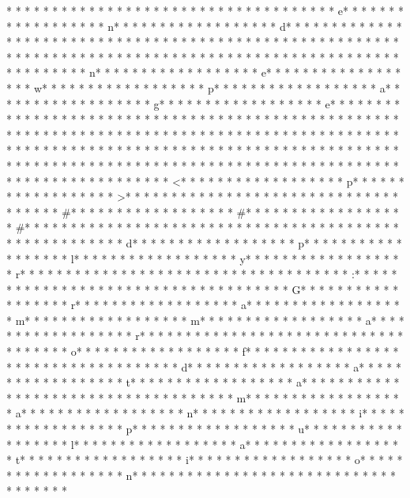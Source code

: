 * * *  * * *  * * *  *  * * *  *  * * *  * 	* * *  * * *  * * *  *  * * *  *  * * *  * e* * *  * * *  * * *  *  * * *  *  * * *  * n* * *  * * *  * * *  *  * * *  *  * * *  * d* * *  * * *  * * *  *  * * *  *  * * *  * {* * *  * * *  * * *  *  * * *  *  * * *  *  * * *  * * *  * * *  *  * * *  *  * * *  * }* * *  * * *  * * *  *  * * *  *  * * *  * 
* * *  * * *  * * *  *  * * *  *  * * *  * 	* * *  * * *  * * *  *  * * *  *  * * *  * n* * *  * * *  * * *  *  * * *  *  * * *  * e* * *  * * *  * * *  *  * * *  *  * * *  * w* * *  * * *  * * *  *  * * *  *  * * *  * p* * *  * * *  * * *  *  * * *  *  * * *  * a* * *  * * *  * * *  *  * * *  *  * * *  * g* * *  * * *  * * *  *  * * *  *  * * *  * e* * *  * * *  * * *  *  * * *  *  * * *  * 
* * *  * * *  * * *  *  * * *  *  * * *  * 	* * *  * * *  * * *  *  * * *  *  * * *  * 
* * *  * * *  * * *  *  * * *  *  * * *  * 	* * *  * * *  * * *  *  * * *  *  * * *  * 
* * *  * * *  * * *  *  * * *  *  * * *  * 	* * *  * * *  * * *  *  * * *  *  * * *  * 
* * *  * * *  * * *  *  * * *  *  * * *  * 	* * *  * * *  * * *  *  * * *  *  * * *  * 
* * *  * * *  * * *  *  * * *  *  * * *  * 	* * *  * * *  * * *  *  * * *  *  * * *  * <* * *  * * *  * * *  *  * * *  *  * * *  * p* * *  * * *  * * *  *  * * *  *  * * *  * >* * *  * * *  * * *  *  * * *  *  * * *  * 
* * *  * * *  * * *  *  * * *  *  * * *  * #* * *  * * *  * * *  *  * * *  *  * * *  * #* * *  * * *  * * *  *  * * *  *  * * *  * #* * *  * * *  * * *  *  * * *  *  * * *  *  * * *  * * *  * * *  *  * * *  *  * * *  * {* * *  * * *  * * *  *  * * *  *  * * *  * d* * *  * * *  * * *  *  * * *  *  * * *  * p* * *  * * *  * * *  *  * * *  *  * * *  * l* * *  * * *  * * *  *  * * *  *  * * *  * y* * *  * * *  * * *  *  * * *  *  * * *  * r* * *  * * *  * * *  *  * * *  *  * * *  *  * * *  * * *  * * *  *  * * *  *  * * *  * :* * *  * * *  * * *  *  * * *  *  * * *  *  * * *  * * *  * * *  *  * * *  *  * * *  * G* * *  * * *  * * *  *  * * *  *  * * *  * r* * *  * * *  * * *  *  * * *  *  * * *  * a* * *  * * *  * * *  *  * * *  *  * * *  * m* * *  * * *  * * *  *  * * *  *  * * *  * m* * *  * * *  * * *  *  * * *  *  * * *  * a* * *  * * *  * * *  *  * * *  *  * * *  * r* * *  * * *  * * *  *  * * *  *  * * *  *  * * *  * * *  * * *  *  * * *  *  * * *  * o* * *  * * *  * * *  *  * * *  *  * * *  * f* * *  * * *  * * *  *  * * *  *  * * *  *  * * *  * * *  * * *  *  * * *  *  * * *  * d* * *  * * *  * * *  *  * * *  *  * * *  * a* * *  * * *  * * *  *  * * *  *  * * *  * t* * *  * * *  * * *  *  * * *  *  * * *  * a* * *  * * *  * * *  *  * * *  *  * * *  *  * * *  * * *  * * *  *  * * *  *  * * *  * m* * *  * * *  * * *  *  * * *  *  * * *  * a* * *  * * *  * * *  *  * * *  *  * * *  * n* * *  * * *  * * *  *  * * *  *  * * *  * i* * *  * * *  * * *  *  * * *  *  * * *  * p* * *  * * *  * * *  *  * * *  *  * * *  * u* * *  * * *  * * *  *  * * *  *  * * *  * l* * *  * * *  * * *  *  * * *  *  * * *  * a* * *  * * *  * * *  *  * * *  *  * * *  * t* * *  * * *  * * *  *  * * *  *  * * *  * i* * *  * * *  * * *  *  * * *  *  * * *  * o* * *  * * *  * * *  *  * * *  *  * * *  * n* * *  * * *  * * *  *  * * *  *  * * *  * }* * *  * * *  * * *  *  * * *  *  * * *  * 
